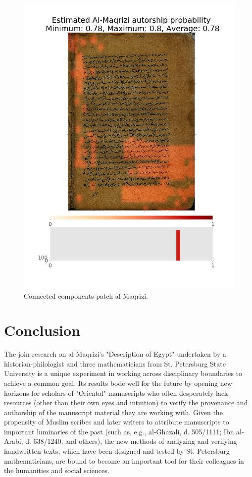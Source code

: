 \documentclass[conference,a4paper,twocolumn]{IEEEtran}
\begin{document}
\begin{figure}[!ht]
\centering
\includegraphics[scale=0.2]{figures/components_al_maqrisi.png}
\caption{Connected components patch al-Maqrizi.}
\label{fig01}
\end{figure}

\section{Conclusion}

The join research on al-Maqrizi’s "Description of Egypt" undertaken by a historian-philologist and three mathematicians from St. Petersburg State University is a unique experiment in working across disciplinary boundaries to achieve a common goal. Its results bode well for the future by opening new horizons for scholars of "Oriental" manuscripts who often desperately lack resources (other than their own eyes and intuition) to verify the provenance and authorship of the manuscript material they are working with. Given the propensity of Muslim scribes and later writers to attribute manuscripts to important luminaries of the past (such as, e.g., al-Ghazali, d. 505/1111; Ibn al-Arabi, d. 638/1240, and others), the new methods of analyzing and verifying handwritten texts, which have been designed and tested by St. Petersburg mathematicians, are bound to become an important tool for their colleagues in the humanities and social sciences.
\end{document}

